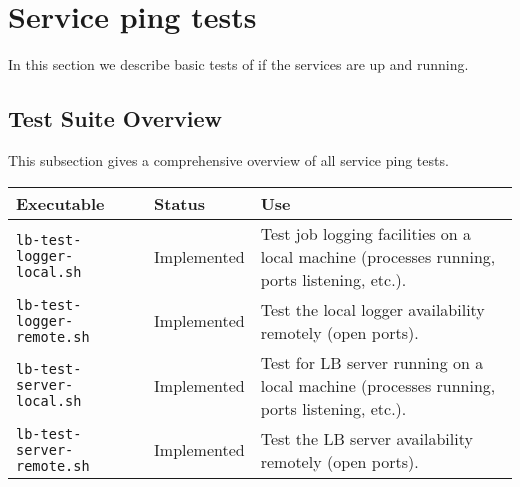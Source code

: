





\section{Service ping tests}
\label{s:ping}

In this section we describe basic tests of \LB if the services are up and running.

\subsection{Test Suite Overview}

This subsection gives a comprehensive overview of all service ping tests.

\begin{tabularx}{\textwidth}{|l|l|X|}
\hline
     {\bf Executable} & {\bf Status} & {\bf Use} \\
\hline
{\tt lb-test-logger-local.sh} & Implemented & Test job logging facilities on a local machine (processes running, ports listening, etc.). \\
\hline
{\tt lb-test-logger-remote.sh} & Implemented & Test the local logger availability remotely (open ports). \\
\hline
{\tt lb-test-server-local.sh} & Implemented & Test for LB server running on a local machine (processes running, ports listening, etc.). \\
\hline
{\tt lb-test-server-remote.sh} & Implemented & Test the LB server availability remotely (open ports). \\
\hline
\end{tabularx}

